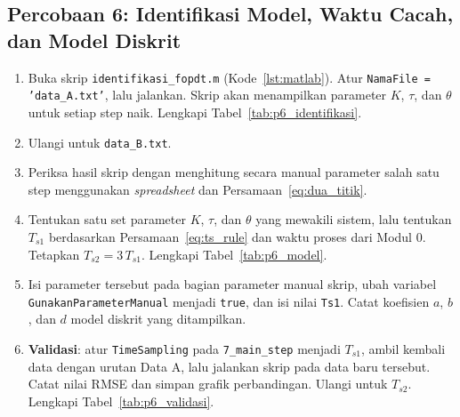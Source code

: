 \documentclass[11pt,a4paper]{article}
\newcommand{\prog}[1]{\texttt{#1}}
\begin{document}
\subsection{Percobaan 6: Identifikasi Model, Waktu Cacah, dan Model Diskrit}
\begin{enumerate}
	\item Buka skrip \prog{identifikasi\_fopdt.m} (Kode~\ref{lst:matlab}). Atur \texttt{NamaFile = 'data\_A.txt'}, lalu jalankan. Skrip akan menampilkan parameter $K$, $\tau$, dan $\theta$ untuk setiap step naik. Lengkapi Tabel~\ref{tab:p6_identifikasi}.
	\item Ulangi untuk \prog{data\_B.txt}.
	\item Periksa hasil skrip dengan menghitung secara manual parameter salah satu step menggunakan \textit{spreadsheet} dan Persamaan~\eqref{eq:dua_titik}.
	\item Tentukan satu set parameter $K$, $\tau$, dan $\theta$ yang mewakili sistem, lalu tentukan $T_{s1}$ berdasarkan Persamaan~\eqref{eq:ts_rule} dan waktu proses dari Modul 0. Tetapkan $T_{s2} = 3\,T_{s1}$. Lengkapi Tabel~\ref{tab:p6_model}.
	\item Isi parameter tersebut pada bagian parameter manual skrip, ubah variabel \texttt{GunakanParameterManual} menjadi \texttt{true}, dan isi nilai \texttt{Ts1}. Catat koefisien $a$, $b$, dan $d$ model diskrit yang ditampilkan.
	\item \textbf{Validasi}: atur \texttt{TimeSampling} pada \prog{7\_main\_step} menjadi $T_{s1}$, ambil kembali data dengan urutan Data A, lalu jalankan skrip pada data baru tersebut. Catat nilai RMSE dan simpan grafik perbandingan. Ulangi untuk $T_{s2}$. Lengkapi Tabel~\ref{tab:p6_validasi}.
\end{enumerate}
\end{document}
